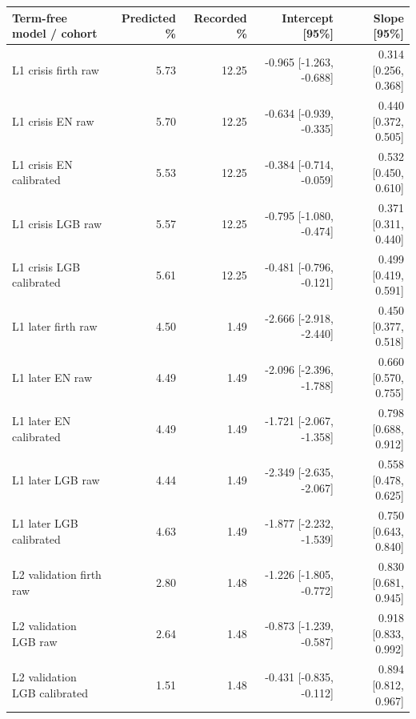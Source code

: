 \begingroup\small\setlength{\tabcolsep}{3pt}
\begin{tabularx}{\linewidth}{Xrrrr}\toprule
Term-free model / cohort & Predicted \% & Recorded \% & Intercept [95\%] & Slope [95\%] \\ \midrule
L1 crisis firth raw & 5.73 & 12.25 & -0.965 [-1.263, -0.688] & 0.314 [0.256, 0.368] \\
L1 crisis EN raw & 5.70 & 12.25 & -0.634 [-0.939, -0.335] & 0.440 [0.372, 0.505] \\
L1 crisis EN calibrated & 5.53 & 12.25 & -0.384 [-0.714, -0.059] & 0.532 [0.450, 0.610] \\
L1 crisis LGB raw & 5.57 & 12.25 & -0.795 [-1.080, -0.474] & 0.371 [0.311, 0.440] \\
L1 crisis LGB calibrated & 5.61 & 12.25 & -0.481 [-0.796, -0.121] & 0.499 [0.419, 0.591] \\
L1 later firth raw & 4.50 & 1.49 & -2.666 [-2.918, -2.440] & 0.450 [0.377, 0.518] \\
L1 later EN raw & 4.49 & 1.49 & -2.096 [-2.396, -1.788] & 0.660 [0.570, 0.755] \\
L1 later EN calibrated & 4.49 & 1.49 & -1.721 [-2.067, -1.358] & 0.798 [0.688, 0.912] \\
L1 later LGB raw & 4.44 & 1.49 & -2.349 [-2.635, -2.067] & 0.558 [0.478, 0.625] \\
L1 later LGB calibrated & 4.63 & 1.49 & -1.877 [-2.232, -1.539] & 0.750 [0.643, 0.840] \\
L2 validation firth raw & 2.80 & 1.48 & -1.226 [-1.805, -0.772] & 0.830 [0.681, 0.945] \\
L2 validation LGB raw & 2.64 & 1.48 & -0.873 [-1.239, -0.587] & 0.918 [0.833, 0.992] \\
L2 validation LGB calibrated & 1.51 & 1.48 & -0.431 [-0.835, -0.112] & 0.894 [0.812, 0.967] \\
\bottomrule\end{tabularx}\endgroup
